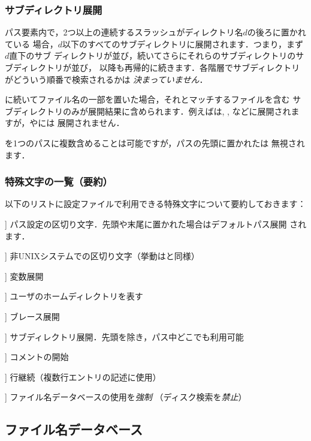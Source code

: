\documentclass[uplatex,dvipdfmx,tombow]{jsarticle}
\begin{document}
\subsubsection{サブディレクトリ展開}
\label{sec:subdirectory-expansion}

パス要素内で，2つ以上の連続するスラッシュがディレクトリ名$d$の後ろに置かれている
場合，$d$以下のすべてのサブディレクトリに展開されます．つまり，まず$d$直下のサブ
ディレクトリが並び，続いてさらにそれらのサブディレクトリのサブディレクトリが並び，
以降も再帰的に続きます．各階層でサブディレクトリがどういう順番で検索されるかは
\emph{決まっていません}．

\samp{//}に続いてファイル名の一部を置いた場合，それとマッチするファイルを含む
サブディレクトリのみが展開結果に含められます．例えばは,
, などに展開されますが，やには
展開されません．

\samp{//}を1つのパスに複数含めることは可能ですが，パスの先頭に置かれた\samp{//}は
無視されます．

\subsubsection{特殊文字の一覧（要約）}

以下のリストに\KPS 設定ファイルで利用できる特殊文字について要約しておきます：
%
\begin{description}
\newcommand{\CODE}[1]{\makebox[3em][l]{\code{#1}}}
\item[\CODE{:}] パス設定の区切り文字．先頭や末尾に置かれた場合はデフォルトパス展開
  されます．
\item[\CODE{;}] 非UNIXシステムでの区切り文字（挙動は\code{:}と同様）
\item[\CODE{\$}] 変数展開
\item[\CODE{\string~}] ユーザのホームディレクトリを表す
\item[\CODE{\char`\{...\char`\}}] ブレース展開
\item[\CODE{//}] サブディレクトリ展開．先頭を除き，パス中どこでも利用可能
\item[\CODE{\%}] コメントの開始
\item[\CODE{\bs}] 行継続（複数行エントリの記述に使用）
\item[\CODE{!!}] ファイル名データベースの使用を\emph{強制}
  （ディスク検索を\emph{禁止}）
\end{description}

\subsection{ファイル名データベース}
\label{sec:filename-database}
\end{document}
